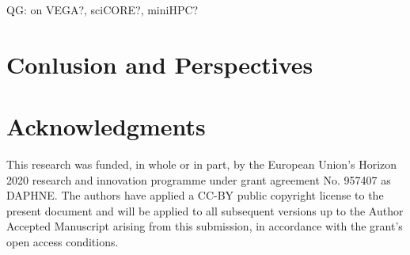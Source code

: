 \documentclass[conference,10pt,a4paper]{IEEEtran}
\newcommand{\qg}[1]{{\color{blue} QG: #1}} %
\begin{document}
\qg{on VEGA?, sciCORE?, miniHPC?}

\section{Conlusion and Perspectives}

\section*{Acknowledgments}

This research was funded, in whole or in part, by the European Union’s Horizon 2020 research and innovation programme under grant agreement No. 957407 as DAPHNE.
The authors have applied a CC-BY public copyright license to the present document and will be applied to all subsequent versions up to the Author Accepted Manuscript arising from this submission, in accordance with the grant’s open access conditions.

\newpage

\printbibliography
\end{document}
